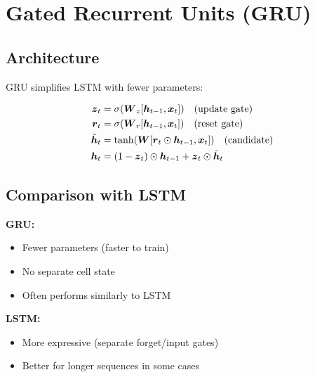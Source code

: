 
\section{Gated Recurrent Units (GRU)}
\label{sec:gru}

\subsection{Architecture}

GRU simplifies LSTM with fewer parameters:

\begin{align}
\boldsymbol{z}_t &= \sigma(\boldsymbol{W}_z [\boldsymbol{h}_{t-1}, \boldsymbol{x}_t]) \quad \text{(update gate)} \\
\boldsymbol{r}_t &= \sigma(\boldsymbol{W}_r [\boldsymbol{h}_{t-1}, \boldsymbol{x}_t]) \quad \text{(reset gate)} \\
\tilde{\boldsymbol{h}}_t &= \tanh(\boldsymbol{W} [\boldsymbol{r}_t \odot \boldsymbol{h}_{t-1}, \boldsymbol{x}_t]) \quad \text{(candidate)} \\
\boldsymbol{h}_t &= (1 - \boldsymbol{z}_t) \odot \boldsymbol{h}_{t-1} + \boldsymbol{z}_t \odot \tilde{\boldsymbol{h}}_t
\end{align}

\subsection{Comparison with LSTM}

\textbf{GRU:}
\begin{itemize}
    \item Fewer parameters (faster to train)
    \item No separate cell state
    \item Often performs similarly to LSTM
\end{itemize}

\textbf{LSTM:}
\begin{itemize}
    \item More expressive (separate forget/input gates)
    \item Better for longer sequences in some cases
\end{itemize}

